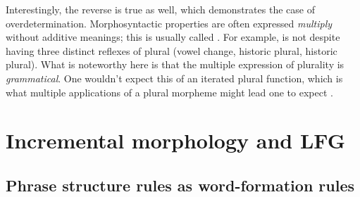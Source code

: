 \documentclass[output=paper,hidelinks]{langscibook}
\begin{document}
Interestingly, the reverse is true as well, which demonstrates 
the case of overdetermination.  Morphosyntactic properties are often
expressed \emph{multiply} without additive meanings; this is usually
called .  For example,  is
not  despite having three distinct reflexes of
plural (vowel change, historic  plural, historic 
plural). What is noteworthy here is that the multiple expression of
plurality is \emph{grammatical}. One wouldn't expect this of an
iterated plural function, which is what multiple applications of a
plural morpheme might lead one to expect \citep[see, for example,][]{harris16}.



\section{Incremental morphology and LFG}
\label{sec:Morph:incr-morph-lfg}

\subsection{Phrase structure rules as word-formation rules}
\label{sec:Morph:psr-wfr}
\end{document}
